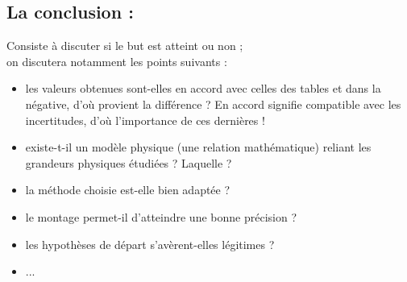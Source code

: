 \documentclass[../main.tex]{subfiles}
\begin{document}
\subsection{La conclusion : }
Consiste à discuter si le but est atteint ou non ;\\
on discutera notamment les points suivants :
\begin{itemize}
    \item les valeurs obtenues sont-elles en accord avec celles des tables et dans la négative, d'où provient la différence ? En accord signifie compatible avec les incertitudes, d'où  l'importance de ces dernières !
    \item existe-t-il un modèle physique (une relation mathématique) reliant les grandeurs physiques étudiées ? Laquelle ?
    \item la méthode choisie est-elle bien adaptée ?
    \item le montage permet-il  d'atteindre une bonne précision ?
    \item les hypothèses de départ s'avèrent-elles légitimes ?
    \item ...
\end{itemize}
\end{document}
